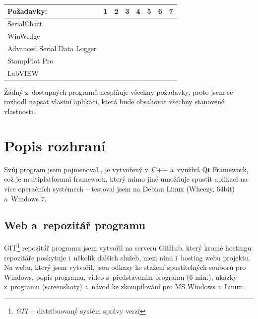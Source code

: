 \documentclass[12pt, a4paper, oneside]{article}
\newcommand{\It}{\textit}  %
\newcommand{\Has}{\textcolor{green}{\CheckmarkBold}}
\newcommand{\NoHas}{\textcolor{red}{\XSolidBrush}}
\begin{document}
\begin{tabular}{ | l | l | l | l | l | l | l | l |}
    \hline
    Požadavky:                  & 1      & 2      & 3      & 4      & 5      & 6      & 7      \\ \hline
    SerialChart                 & \Has   & \NoHas & \Has   & \NoHas & \Has   & \Has   & \Has   \\ \hline 
    WinWedge                    & \NoHas & \Has   & \Has   & \NoHas & \NoHas & \NoHas & \NoHas \\ \hline 
    Advanced Serial Data Logger & \NoHas & \Has   & \Has   & \NoHas & \NoHas & \NoHas & \NoHas \\ \hline 
    StampPlot Pro               & \Has   & \Has   & \NoHas & \NoHas & \Has   & \NoHas & \Has   \\ \hline 
    LabVIEW                     & \Has   & \Has   & \NoHas & \Has   & \NoHas & \NoHas & \Has   \\ \hline
\end{tabular}

\vspace{5mm}

Žádný z~dostupných programů nesplňuje všechny požadavky, proto jsem se rozhodl napsat vlastní aplikaci, která bude obsahovat všechny stanovené vlastnosti. 

\section{Popis rozhraní}
Svůj program jsem pojmenoval , je vytvořený v~C++ a~využívá Qt Framework\cite{qtfrm}, což je multiplatformní framework, který mimo jiné umožňuje spustit aplikaci na více operačních systémech -- testoval jsem na Debian Linux\cite{debian} (Wheezy, 64bit) a~Windows 7.

\subsection{Web a~repozitář programu}
GIT\footnote{\It{GIT} -- distribuovaný systém správy verzí} repozitář programu jsem vytvořil na serveru GitHub\cite{github}, který kromě hostingu repozitáře poskytuje i~několik dalších služeb, mezi nimi i~hosting webu projektu. Na webu, který jsem vytvořil, jsou odkazy ke stažení spustitelných souborů pro Windows, popis programu, video s~představením programu (6 min.), ukázky z~programu (screenshoty) a~návod ke zkompilování pro MS Windows a~Linux.
\end{document}

